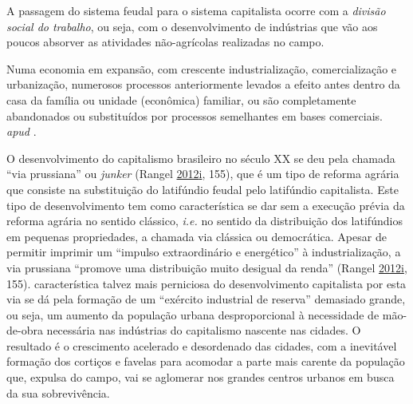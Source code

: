 \documentclass[
	12pt,				%
	oneside,			%
	a4paper,			%
	chapter=TITLE,		%
	section=TITLE,		%
	english,			%
	brazil				%
	]{abntex2}
\begin{document}
A passagem do sistema feudal para o sistema capitalista ocorre com a \emph{divisão
social do trabalho}, ou seja, com o desenvolvimento de indústrias que vão aos
poucos absorver as atividades não-agrícolas realizadas no campo.
\begin{citacao}
Numa economia em expansão, com crescente industrialização, comercialização e
urbanização, numerosos processos anteriormente levados a efeito antes dentro da
casa da família ou unidade (econômica) familiar, ou são completamente
abandonados ou substituídos por processos semelhantes em bases
comerciais. \cite[p. 41]{kuznets} \textit{apud} \cite[p. 218]{rangel1956}.
\end{citacao}
O desenvolvimento do capitalismo brasileiro no século XX se deu pela chamada
``via prussiana'' ou \emph{junker} (Rangel \protect\hyperlink{ref-rangel1988}{2012}\protect\hyperlink{ref-rangel1988}{i}, 155), que é um tipo de reforma agrária
que consiste na substituição do latifúndio feudal pelo latifúndio capitalista.
Este tipo de desenvolvimento tem como característica se dar sem a execução
prévia da reforma agrária no sentido clássico, \emph{i.e.} no sentido da distribuição
dos latifúndios em pequenas propriedades, a chamada via clássica ou democrática.
Apesar de permitir imprimir um ``impulso extraordinário e energético'' à
industrialização, a via prussiana ``promove uma distribuição muito desigual da
renda'' (Rangel \protect\hyperlink{ref-rangel1988}{2012}\protect\hyperlink{ref-rangel1988}{i}, 155). característica talvez mais perniciosa do
desenvolvimento capitalista por esta via se dá pela formação de um ``exército
industrial de reserva'' demasiado grande, ou seja, um aumento da população urbana
desproporcional à necessidade de mão-de-obra necessária nas indústrias do
capitalismo nascente nas cidades. O resultado é o crescimento acelerado e
desordenado das cidades, com a inevitável formação dos cortiços e favelas para
acomodar a parte mais carente da população que, expulsa do campo, vai se
aglomerar nos grandes centros urbanos em busca da sua sobrevivência.
\end{document}
